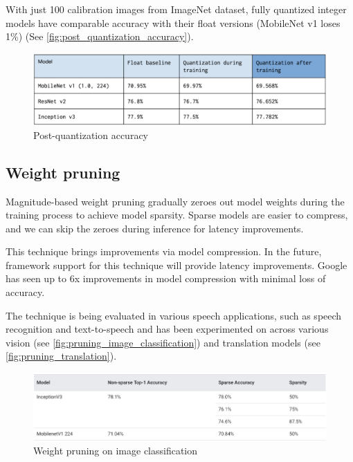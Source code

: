 With just 100 calibration images from ImageNet dataset, fully quantized integer
models have comparable accuracy with their float versions (MobileNet v1 loses
1\%) (See \autoref{fig:post_quantization_accuracy}).

\begin{figure}[ht]
    \includegraphics[width=\textwidth]{images/introduction/post_quantization_accuracy.png}
    \centering
    \caption{Post-quantization accuracy}\label{fig:post_quantization_accuracy}
\end{figure}

\subsection{Weight pruning}
Magnitude-based weight pruning gradually zeroes out model weights during the
training process to achieve model sparsity. Sparse models are easier to
compress, and we can skip the zeroes during inference for latency improvements.

This technique brings improvements via model compression. In the future,
framework support for this technique will provide latency improvements.
Google has seen up to 6x improvements in model compression with minimal loss of
accuracy.

The technique is being evaluated in various speech applications, such as speech
recognition and text-to-speech and has been experimented on across various
vision (see \autoref{fig:pruning_image_classification}) and translation
models (see \autoref{fig:pruning_translation}).~\cite{tfmot:pruning}

\begin{figure}[ht]
    \includegraphics[width=\textwidth]{images/introduction/pruning_image_classification.png}
    \centering
    \caption{Weight pruning on image classification}\label{fig:pruning_image_classification}
\end{figure}

